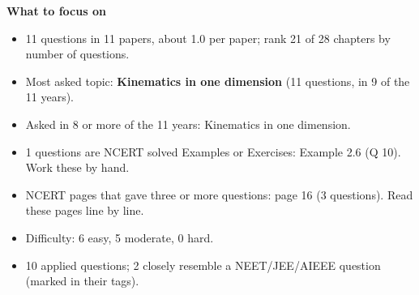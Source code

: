 \begin{minipage}[t]{0.63\linewidth}{\small\textbf{\color{crimson}What to focus on}\par\smallskip
\begin{itemize}[leftmargin=1.1em,itemsep=1pt,topsep=0pt]
\item 11 questions in 11 papers, about 1.0 per paper; rank 21 of 28 chapters by number of questions.
\item Most asked topic: \textbf{Kinematics in one dimension} (11 questions, in 9 of the 11 years).
\item Asked in 8 or more of the 11 years: Kinematics in one dimension.
\item 1 questions are NCERT solved Examples or Exercises: Example 2.6 (Q 10). Work these by hand.
\item NCERT pages that gave three or more questions: page 16 (3 questions). Read these pages line by line.
\item Difficulty: 6 easy, 5 moderate, 0 hard.
\item 10 applied questions; 2 closely resemble a NEET/JEE/AIEEE question (marked in their tags).
\end{itemize}}\end{minipage}\par
{}
